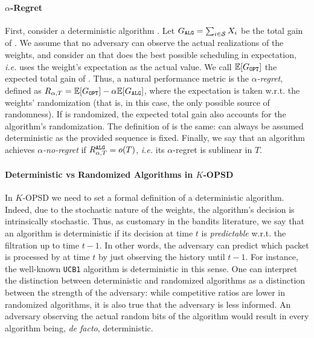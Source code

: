 \paragraph{$\alpha$-Regret} First, consider a deterministic algorithm \alg. Let $\Galg = \sum_{i\in \mathcal{S}} X_i$ be the total gain of \alg. We assume that no adversary can observe the actual realizations of the weights, and consider an \opt that does the best possible scheduling in expectation, \emph{i.e.} uses the weight's expectation as the actual value. We call $\mathbb{E}[\Gopt]$ the expected total gain of \opt. Thus, a natural performance metric is the \textit{$\alpha$-regret}, defined as $R_{\alpha,T} = \mathbb{E}[\Gopt] - \alpha\mathbb{E}[\Galg]$, where the expectation is taken w.r.t. the weights' randomization (that is, in this case, the only possible source of randomness). If \alg is randomized, the expected total gain also accounts for the algorithm's randomization. The definition of \opt is the same: \opt can always be assumed deterministic as the provided sequence is fixed. Finally, we say that an algorithm achieves \textit{$\alpha$-no-regret} if $R_{\alpha,T}^{\text{\alg} }= o(T)$, \emph{i.e.} its $\alpha$-regret is sublinear in $T$.

\paragraph{Deterministic vs Randomized Algorithms in $K$-OPSD}
In $K$-OPSD we need to set a formal definition of a deterministic algorithm. Indeed, due to the stochastic nature of the weights, the algorithm's decision is intrinsically stochastic. Thus, as customary in the bandits literature, we say that an algorithm is deterministic if its decision at time $t$ is \textit{predictable} w.r.t. the filtration up to time $t-1$. In other words, the adversary can predict which packet is processed by \alg at time $t$ by just observing the history until $t-1$. For instance, the well-known \texttt{UCB1} algorithm \citep{auer2002finite} is deterministic in this sense. One can interpret the distinction between deterministic and randomized algorithms as a distinction between the strength of the adversary: while competitive ratios are lower in randomized algorithms, it is also true that the adversary is less informed. An adversary observing the actual random bits of the algorithm would result in every algorithm being, \textit{de facto}, deterministic.

